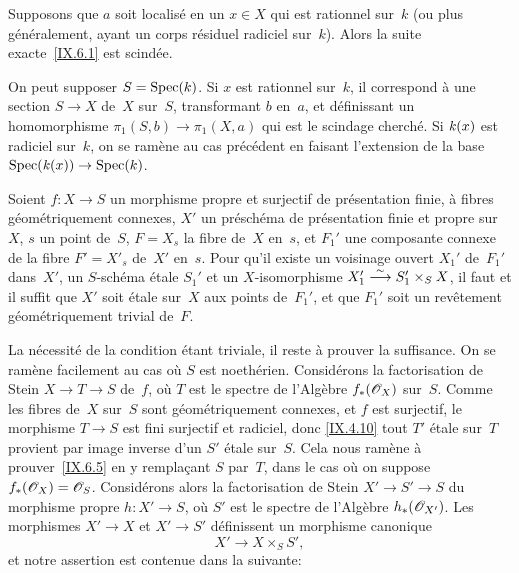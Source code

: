\begin{corollaire}
\label{IX.6.4}
Supposons que $a$ soit localis\'e en un $x\in X$ qui est rationnel
sur~$k$ (ou plus g\'en\'eralement, ayant un corps r\'esiduel
radiciel sur~$k$). Alors la suite exacte~\ref{IX.6.1} est scind\'ee.
\end{corollaire}

On peut supposer $S=\operatorname{Spec}(k)$. Si $x$ est rationnel sur~$k$, il
correspond \`a une section $S\to X$ de~$X$ sur~$S$, transformant $b$
en~$a$, et d\'efinissant un homomorphisme $\pi_1(S,b)\to \pi_1(X,a)$
qui est le scindage cherch\'e. Si $\mathit{k}(x)$ est radiciel sur~$k$, on se
ram\`ene au cas pr\'ec\'edent en faisant l'extension de la base
$\Spec(\kres(x))\to\Spec(k)$.

\begin{theoreme}
\label{IX.6.5}
Soient $f\colon X\to S$ un morphisme propre et surjectif de
pr\'esentation finie, \`a fibres g\'eom\'etriquement connexes,
$X'$ un pr\'esch\'ema de pr\'esentation finie et propre sur~$X$,
$s$ un point de~$S$, $F=X_s$ la fibre de~$X$ en~$s$, et $F_1'$ une
composante connexe de la fibre $F'=X'_s$ de~$X'$ en~$s$. Pour qu'il
existe un voisinage ouvert $X_1'$ de~$F_1'$ dans~$X'$, un
$S$-sch\'ema \'etale $S_1'$ et un $X$-isomorphisme $X_1'\overset{\sim}{\longrightarrow}
S_1'\times_S X$, il faut et il suffit que $X'$ soit \'etale sur~$X$
aux points de~$F_1'$, et que $F_1'$ soit un rev\^etement
g\'eom\'etriquement trivial de~$F$.
\end{theoreme}

La
n\'ecessit\'e de la condition \'etant triviale, il reste
\`a prouver la suffisance. On se ram\`ene facilement au cas o\`u
$S$ est noeth\'erien. Consid\'erons la factorisation de Stein
$X\to T\to S$ de~$f$, o\`u $T$ est le spectre de l'Alg\`ebre
$f_*(\cal{O}_X)$ sur~$S$. Comme les fibres de~$X$ sur~$S$ sont
g\'eom\'etriquement connexes, et $f$ est surjectif, le morphisme
$T\to S$ est fini surjectif et radiciel, donc \eqref{IX.4.10} tout
$T'$ \'etale sur~$T$ provient par image inverse d'un $S'$ \'etale
sur~$S$. Cela nous ram\`ene \`a
prouver~\ref{IX.6.5}
en y rempla\c cant $S$ par~$T$, \ie dans le cas o\`u on suppose
$f_*(\cal{O}_X)=\cal{O}_S$. Consid\'erons alors la factorisation de
Stein $X'\to S'\to S$ du morphisme propre $h\colon X'\to S$, o\`u
$S'$ est le spectre de l'Alg\`ebre $h_*(\cal{O}_{X'})$. Les
morphismes $X'\to X$ et $X'\to S'$ d\'efinissent un morphisme
canonique
$$
X'\to X\times_S S',
$$
et notre assertion est contenue dans la suivante:

